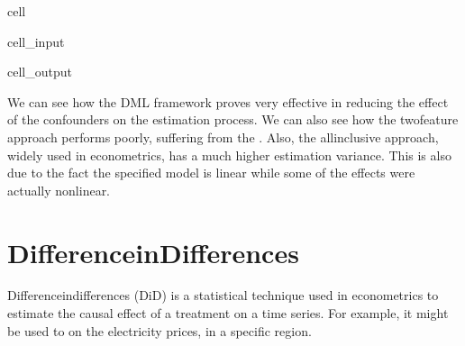 \documentclass[letterpaper,10pt,english]{jupyterBook}
\begin{document}
\begin{sphinxuseclass}{cell}
\begin{sphinxVerbatimInput}
\begin{sphinxuseclass}{cell_input}
\end{sphinxuseclass}\end{sphinxVerbatimInput}
\begin{sphinxVerbatimOutput}

\begin{sphinxuseclass}{cell_output}
\noindent{}

\end{sphinxuseclass}\end{sphinxVerbatimOutput}

\end{sphinxuseclass}
\sphinxAtStartPar
We can see how the DML framework proves very effective in reducing the effect of the confounders on the estimation process. We can also see how the two\sphinxhyphen{}feature approach performs poorly, suffering from the . Also, the all\sphinxhyphen{}inclusive approach, widely used in econometrics, has a much higher estimation variance. This is also due to the fact the specified model is linear while some of the effects were actually nonlinear.

\sphinxstepscope


\chapter{Difference\sphinxhyphen{}in\sphinxhyphen{}Differences}
\label{\detokenize{notebooks/diff_in_diff:difference-in-differences}}\label{\detokenize{notebooks/diff_in_diff::doc}}
\sphinxAtStartPar
Difference\sphinxhyphen{}in\sphinxhyphen{}differences (DiD) is a statistical technique used in econometrics to estimate the causal effect of a treatment on a time series. For example, it might be used to  on the electricity prices, in a specific region.
\end{document}
